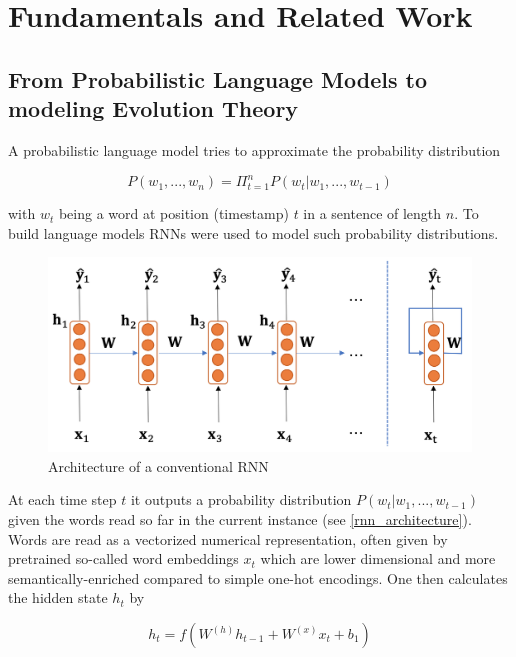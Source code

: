 \section{Fundamentals and Related Work} \label{fundamentals}

\subsection{From Probabilistic Language Models to modeling Evolution Theory} \label{fundamentalsA}

A probabilistic language model tries to approximate the probability distribution 

\begin{equation}
	P(w_1, ..., w_n) = \Pi_{t=1}^{n} P(w_t | w_1, ..., w_{t-1})
\end{equation}

with $w_t$ being a word at position (timestamp) $t$ in a sentence of length $n$. To build language models \acp{RNN} were used to model such probability distributions. 

\begin{figure}[ht]
	\centering
	\includegraphics[width=1.0\linewidth]{figures/rnn_architecture.png}
	\caption{Architecture of a conventional \ac{RNN} \cite{Gertz2020}}
	\label{rnn_architecture}
\end{figure}

At each time step $t$ it outputs a probability distribution $P(w_t | w_1, ..., w_{t-1})$ given the words read so far in the current instance (see \autoref{rnn_architecture}). Words are read as a vectorized numerical representation, often given by pretrained so-called word embeddings $x_t$ which are lower dimensional and more semantically-enriched compared to simple one-hot encodings. One then calculates the hidden state $h_t$ by

\begin{equation}
	h_t = f(W^{(h)} h_{t-1} + W^{(x)} x_t + b_1)
\end{equation}


